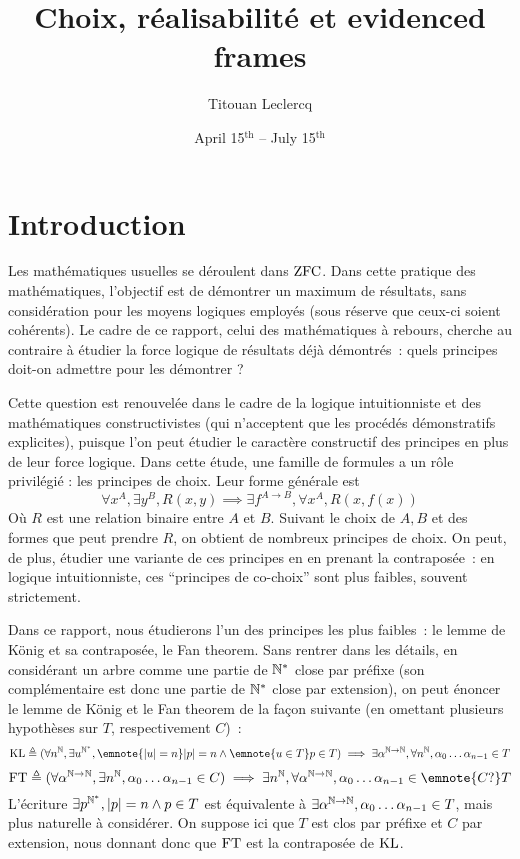 \documentclass{article}
\title{Choix, réalisabilité et evidenced frames}
\author{Titouan Leclercq}
\date{April 15$^{\mathrm{th}}$ -- July 15$^{\mathrm{th}}$}
\begin{document}
\maketitle

\tableofcontents

\section{Introduction}

Les mathématiques usuelles se déroulent dans $\mathrm{ZFC}$. Dans cette pratique des mathématiques, l'objectif est de démontrer un maximum de résultats, sans considération pour les moyens logiques employés (sous réserve que ceux-ci soient cohérents). Le cadre de ce rapport, celui des mathématiques à rebours, cherche au contraire à étudier la force logique de résultats déjà démontrés~: quels principes doit-on admettre pour les démontrer ?

Cette question est renouvelée dans le cadre de la logique intuitionniste et des mathématiques constructivistes (qui n'acceptent que les procédés démonstratifs explicites), puisque l'on peut étudier le caractère constructif des principes en plus de leur force logique. Dans cette étude, une famille de formules a un rôle privilégié : les principes de choix. Leur forme générale est
\[\forall x^A, \exists y^B, R(x,y) \implies \exists f^{A\to B}, \forall x^A, R(x,f(x))\]
Où $R$ est une relation binaire entre $A$ et $B$. Suivant le choix de $A,B$ et des formes que peut prendre $R$, on obtient de nombreux principes de choix. On peut, de plus, étudier une variante de ces principes en en prenant la contraposée~: en logique intuitionniste, ces ``principes de co-choix'' sont plus faibles, souvent strictement.

Dans ce rapport, nous étudierons l'un des principes les plus faibles~: le lemme de König et sa contraposée, le Fan theorem.
Sans rentrer dans les détails, en considérant un arbre comme une partie de $\mathbb{N}^*$ close par préfixe (son complémentaire est donc une partie de $\mathbb{N}^*$ close par extension), on peut énoncer le lemme de König et le Fan theorem de la façon suivante (en omettant plusieurs hypothèses sur $T$, respectivement $C$)~:
\[\KL \defeq (\forall n^{\bN}, \exists u^{\bN^*}, \emnote{|u|=n}|p| = n \land \emnote{u\in T}p \in T) \implies \exists \alpha^{\bN\to\bN}, \forall n^{\bN}, \alpha_0\ldots\alpha_{n-1}\in T\]
\[\FT \defeq (\forall \alpha^{\bN\to\bN}, \exists n^\bN, \alpha_0\ldots \alpha_{n-1}\in C)\implies \exists n^\bN, \forall \alpha^{\bN\to\bN}, \alpha_0\ldots\alpha_{n-1}\in \emnote{C?}T\]
L'écriture $\exists p^{\mathbb{N}^*},|p| = n \land p \in T$ est équivalente à $\exists \alpha^{\mathbb{N}\to\mathbb{N}}, \alpha_0\ldots\alpha_{n-1}\in T$, mais plus naturelle à considérer. On suppose ici que $T$ est clos par préfixe et $C$ par extension, nous donnant donc que $\mathrm{FT}$ est la contraposée de $\mathrm{KL}$.
\end{document}
